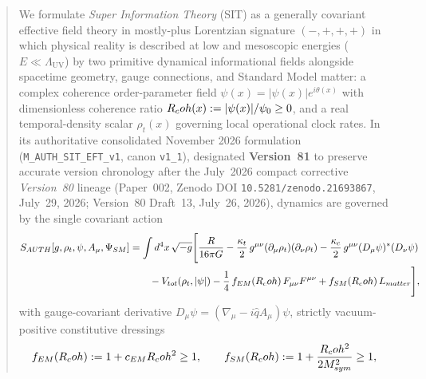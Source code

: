 \begin{abstract}
We formulate \emph{Super Information Theory} (SIT) as a generally covariant effective field theory in mostly-plus Lorentzian signature $(-,+,+,+)$ in which physical reality is described at low and mesoscopic energies ($E \ll \Lambda_{\mathrm{UV}}$) by two primitive dynamical informational fields alongside spacetime geometry, gauge connections, and Standard Model matter: a complex coherence order-parameter field $\psi(x) = |\psi(x)| e^{i\theta(x)}$ with dimensionless coherence ratio $\Rcoh(x) := |\psi(x)|/\psi_0 \ge 0$, and a real temporal-density scalar $\rho_t(x)$ governing local operational clock rates. In its authoritative consolidated November 2026 formulation (\texttt{M\_AUTH\_SIT\_EFT\_v1}, canon \texttt{v1\_1}), designated \textbf{Version~81} to preserve accurate version chronology after the July~2026 compact corrective \emph{Version~80} lineage (Paper~002, Zenodo DOI \texttt{10.5281/zenodo.21693867}, July~29, 2026; Version~80 Draft~13, July~26, 2026), dynamics are governed by the single covariant action
\begin{align}
S_{\mathrm{AUTH}}[g,\rho_t,\psi,A_\mu,\Psi_{\mathrm{SM}}]
&= \int d^4x\,\sqrt{-g}\Biggl[
  \frac{R}{16\pi G}
  - \frac{\kappa_t}{2}\,g^{\mu\nu}(\partial_\mu\rho_t)(\partial_\nu\rho_t)
  - \frac{\kappa_c}{2}\,g^{\mu\nu}(D_\mu\psi)^*(D_\nu\psi)
  \nonumber\\
&\qquad
  - V_{\mathrm{tot}}(\rho_t,|\psi|)
  - \frac{1}{4}\,f_{\mathrm{EM}}(\Rcoh)\,F_{\mu\nu}F^{\mu\nu}
  + f_{\mathrm{SM}}(\Rcoh)\,\mathcal{L}_{\mathrm{matter}}
\Biggr],
\label{eq:abstract_master_action}
\end{align}
with gauge-covariant derivative $D_\mu\psi = (\nabla_\mu - i\hat{q}A_\mu)\psi$, strictly vacuum-positive constitutive dressings
\[
f_{\mathrm{EM}}(\Rcoh) := 1 + c_{\mathrm{EM}}\Rcoh^2 \ge 1,
\qquad
f_{\mathrm{SM}}(\Rcoh) := 1 + \frac{\Rcoh^2}{2 M_{\mathrm{sym}}^2} \ge 1,
\]

\end{abstract}
